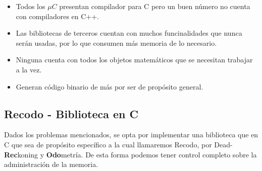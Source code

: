 \documentclass[main.tex]{subfiles}
\begin{document}
\begin{itemize}
\item Todos los ${\mu}C$ presentan compilador para C
      pero un buen número no cuenta con compiladores en C++.
\item Las bibliotecas de terceros cuentan con muchos
      funcinalidades que nunca serán usadas, por lo
      que consumen más memoria de lo necesario.
\item Ninguna cuenta con todos los objetos matemáticos que se
      necesitan trabajar a la vez.
\item Generan código binario de más por ser de propósito general.
\end{itemize}

\subsection{Recodo - Biblioteca en C}
Dados los problemas mencionados, se opta por implementar una
biblioteca que en C que sea de propósito específico a la cual
llamaremos Recodo, por Dead-\textbf{Rec}koning y
\textbf{Odo}metría. De esta forma podemos tener control
completo sobre la administración de la memoria.

\hfill



%
%

\end{document}
